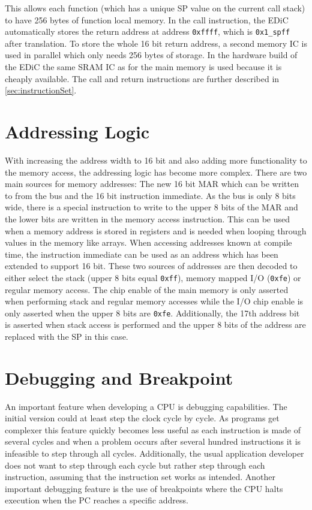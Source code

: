 This allows each function (which has a unique \gls{SP} value on the current call stack) to have 256 bytes of function local memory.
In the call instruction, the \gls{EDiC} automatically stores the return address at address \texttt{0xffff}, which is \texttt{0x1\_spff} after translation.
To store the whole 16 bit return address, a second memory \gls{IC} is used in parallel which only needs 256 bytes of storage.
In the hardware build of the \gls{EDiC} the same \gls{SRAM} \gls{IC} as for the main memory is used because it is cheaply available.
The call and return instructions are further described in \cref{sec:instructionSet}.
\section{Addressing Logic}\label{sec:addrLogic}
With increasing the address width to 16 bit and also adding more functionality to the memory access, the addressing logic has become more complex.
There are two main sources for memory addresses: The new 16 bit \gls{MAR} which can be written to from the bus and the 16 bit instruction immediate.
As the bus is only 8 bits wide, there is a special instruction to write to the upper 8 bits of the \gls{MAR} and the lower bits are written in the memory access instruction.
This can be used when a memory address is stored in registers and is needed when looping through values in the memory like arrays.
When accessing addresses known at compile time, the instruction immediate can be used as an address which has been extended to support 16 bit.
These two sources of addresses are then decoded to either select the stack (upper 8 bits equal \texttt{0xff}), memory mapped I/O (\texttt{0xfe}) or regular memory access.
The chip enable of the main memory is only asserted when performing stack and regular memory accesses while the I/O chip enable is only asserted when the upper 8 bits are \texttt{0xfe}.
Additionally, the 17th address bit is asserted when stack access is performed and the upper 8 bits of the address are replaced with the \gls{SP} in this case.

\section{Debugging and Breakpoint}
An important feature when developing a \gls{CPU} is debugging capabilities.
The initial version could at least step the clock cycle by cycle.
As programs get complexer this feature quickly becomes less useful as each instruction is made of several cycles and when a problem occurs after several hundred instructions it is infeasible to step through all cycles.
Additionally, the usual application developer does not want to step through each cycle but rather step through each instruction, assuming that the instruction set works as intended.
Another important debugging feature is the use of breakpoints where the \gls{CPU} halts execution when the \gls{PC} reaches a specific address.

